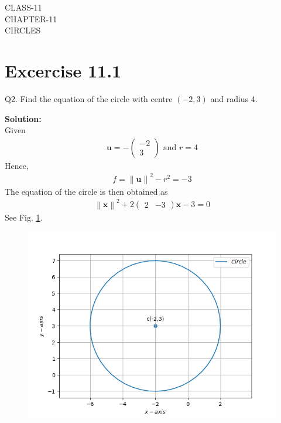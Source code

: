 \documentclass[12pt]{article}
\providecommand{\norm}[1]{\left\lVert#1\right\rVert}
\newcommand{\solution}{\noindent \textbf{Solution: }}
\newcommand{\myvec}[1]{\ensuremath{\begin{pmatrix}#1\end{pmatrix}}}
\let\vec\mathbf
\begin{document}
\begin{center}
\textbf\large{CLASS-11\\CHAPTER-11 \\ CIRCLES}

\end{center}
\section*{Excercise 11.1}

Q2. Find the equation of the circle with centre $(-2,3)$ and radius 4.

\solution
\\
\fi
Given
\begin{align}
	\vec{u} = -\myvec{-2\\3} \text{ and } r = 4
\end{align}
Hence, 
\begin{align}
	f = \norm{\vec{u}}^2 - r^2= -3
\end{align}
The equation of the circle is then obtained as
\begin{align}
	\norm{\vec{x}}^2 + 2\myvec{2&-3}\vec{x} -3=0     		       
\end{align}	
See Fig. 
\ref{fig:chapters/11/11/1/2/Fig1}.
\begin{figure}[!h]
	\begin{center} 
	    \includegraphics[width=\columnwidth]{chapters/11/11/1/2/figs/circle.png}
	\end{center}
\caption{}
\label{fig:chapters/11/11/1/2/Fig1}
\end{figure}
\end{document}
